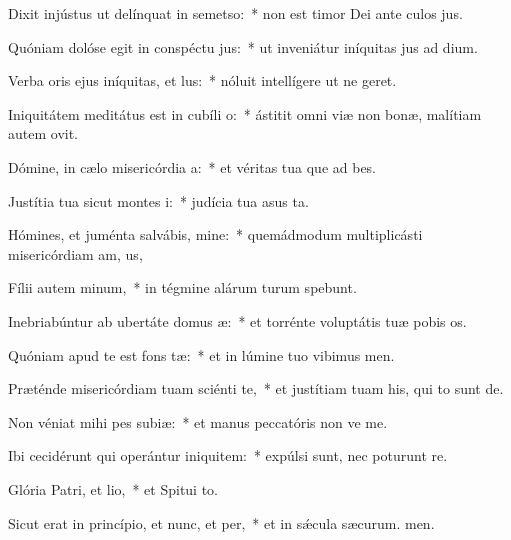 \item Dixit injústus ut delínquat in semetso:~* non est timor Dei ante culos jus.
\item Quóniam dolóse egit in conspéctu jus:~* ut inveniátur iníquitas jus ad dium.
\item Verba oris ejus iníquitas, et lus:~* nóluit intellígere ut ne geret.
\item Iniquitátem meditátus est in cubíli o:~* ástitit omni viæ non bonæ, malítiam autem  ovit.
\item Dómine, in cælo misericórdia a:~* et véritas tua que ad bes.
\item Justítia tua sicut montes i:~* judícia tua asus ta.
\item Hómines, et juménta salvábis, mine:~* quemádmodum multiplicásti misericórdiam am, us,
\item Fílii autem minum,~* in tégmine alárum turum spebunt.
\item Inebriabúntur ab ubertáte domus æ:~* et torrénte voluptátis tuæ pobis os.
\item Quóniam apud te est fons tæ:~* et in lúmine tuo vibimus men.
\item Præténde misericórdiam tuam sciénti te,~* et justítiam tuam his, qui to sunt de.
\item Non véniat mihi pes subiæ:~* et manus peccatóris non ve me.
\item Ibi cecidérunt qui operántur iniquitem:~* expúlsi sunt, nec poturunt re.
\item Glória Patri, et lio,~* et Spitui to.
\item Sicut erat in princípio, et nunc, et per,~* et in sǽcula sæcurum. men.
